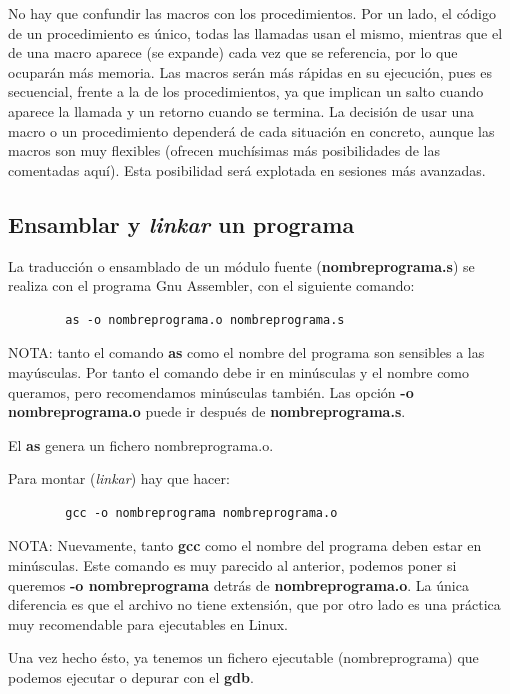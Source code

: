 \begin{itemize}
No hay que confundir las macros con los procedimientos. Por un lado,
el código de un procedimiento es único, todas las llamadas usan el
mismo, mientras que el de una macro aparece (se expande) cada vez que
se referencia, por lo que ocuparán más memoria. Las macros serán
más rápidas en su ejecución, pues es secuencial, frente a la de
los procedimientos, ya que implican un salto cuando aparece la llamada
y un retorno cuando se termina. La decisión de usar una macro o un
procedimiento dependerá de cada situación en concreto, aunque las
macros son muy flexibles (ofrecen muchísimas más posibilidades de las
comentadas aquí). Esta posibilidad será explotada en sesiones más avanzadas.

\end{itemize}

\subsection{Ensamblar y {\it linkar} un programa}

La traducción o ensamblado de un módulo fuente ({\bf nombreprograma.s})
se realiza con el programa Gnu Assembler, con el siguiente comando:

\begin{lstlisting}
        as -o nombreprograma.o nombreprograma.s
\end{lstlisting}

NOTA: tanto el comando {\bf as} como el nombre del programa son sensibles
a las mayúsculas. Por tanto el comando debe ir en minúsculas y el nombre
como queramos, pero recomendamos minúsculas también.
Las opción {\bf -o nombreprograma.o} puede ir después de {\bf nombreprograma.s}.

El {\bf as} genera un fichero nombreprograma.o.

Para montar ({\it linkar}) hay que hacer:

\begin{lstlisting}
        gcc -o nombreprograma nombreprograma.o
\end{lstlisting}

NOTA: Nuevamente, tanto {\bf gcc} como el nombre del programa deben estar
en minúsculas. Este comando es muy parecido al anterior, podemos poner si
queremos {\bf -o nombreprograma} detrás de {\bf nombreprograma.o}. La única
diferencia es que el archivo no tiene extensión, que por otro lado es una
práctica muy recomendable para ejecutables en Linux.

Una vez hecho ésto, ya tenemos un fichero ejecutable (nombreprograma) que
podemos ejecutar o depurar con el {\bf gdb}.

